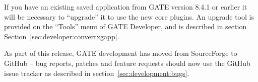 If you have an existing saved application from GATE version 8.4.1 or earlier it
will be necessary to ``upgrade'' it to use the new core plugins.  An upgrade
tool is provided on the ``Tools'' menu of GATE Developer, and is described in
section Section~\ref{sec:developer:convertxgapp}.


As part of this release, GATE development has moved from SourceForge to GitHub
-- bug reports, patches and feature requests should now use the GitHub issue
tracker as described in section~\ref{sec:development:bugs}.

